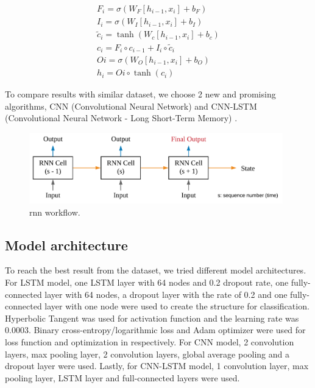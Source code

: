 \documentclass[3p,times,procedia]{elsarticle}
\begin{document}
\begin{equation}
\begin{array}{l}
{F_{i}=\sigma\left(W_{F}\left[h_{i-1}, x_{i}\right]+b_{F}\right)} \\ {I_{i}=\sigma\left(W_{I}\left[h_{i-1}, x_{i}\right]+b_{I}\right)} \\ 
{\tilde{c}_{i}=\tanh \left(W_{c}\left[h_{i-1}, x_{i}\right]+b_{c}\right)} \\ 
{c_{i}=F_{i} \circ c_{i-1}+I_{i} \circ \tilde{c}_{i}} \\ {O{i}=\sigma\left(W_{O}\left[h_{i-1}, x_{i}\right]+b_{O}\right)} \\ 
{h_{i}=O{i} \circ \tanh \left(c_{i}\right)}\end{array}
\end{equation}

To compare results with similar dataset, we choose 2 new and promising algorithms, CNN (Convolutional Neural Network) and CNN-LSTM (Convolutional Neural Network - Long Short-Term Memory) \cite{Karim2018}.

\begin{figure}[t]\vspace*{4pt}
\centerline{\includegraphics[width=110mm]{graphics/Simple_RNN.png}}
\caption{rnn workflow.}
\end{figure}

\subsection{Model architecture}
To reach the best result from the dataset, we tried different model architectures. For LSTM model, one LSTM layer with 64 nodes and 0.2 dropout rate, one fully-connected layer with 64 nodes, a dropout layer with the rate of 0.2 and one fully-connected layer with one node were used to create the structure for classification. Hyperbolic Tangent was used for activation function and the learning rate was $0.0003$. Binary cross-entropy/logarithmic loss and Adam optimizer were used for loss function and optimization in respectively.  
For CNN model, 2 convolution layers, max pooling layer, 2 convolution layers, global average pooling and a dropout layer were used. Lastly, for CNN-LSTM model, 1 convolution layer, max pooling layer, LSTM layer and full-connected layers were used. 
\end{document}
